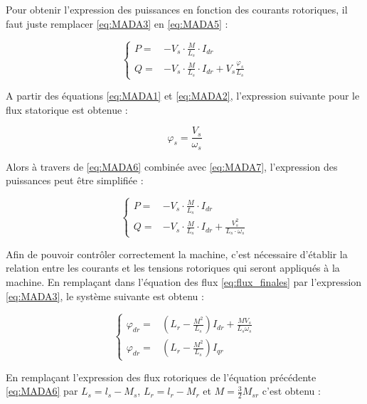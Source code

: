 Pour obtenir l'expression des puissances en fonction des courants rotoriques, il faut juste remplacer \ref{eq:MADA3} en \ref{eq:MADA5} :


\begin{equation}
    \left\{
    \begin{aligned}
        P =& - V_{s} \cdot \frac{M}{L_s} \cdot I_{dr} \\
        Q =& - V_{s} \cdot \frac{M}{L_s} \cdot I_{dr} + V_s \frac{\varphi_s}{L_s} 
    \end{aligned}
    \right.
    \label{eq:MADA6}
\end{equation}

A partir des équations \ref{eq:MADA1} et \ref{eq:MADA2}, l'expression suivante pour le flux statorique est obtenue :

\begin{equation}
    \varphi_s = \frac{V_s}{\omega_s}
    \label{eq:MADA7}
 \end{equation}

 Alors à travers de \ref{eq:MADA6} combinée avec \ref{eq:MADA7}, l'expression des puissances peut être simplifiée :

 \begin{equation}
    \left\{
    \begin{aligned}
        P =& - V_{s} \cdot \frac{M}{L_s} \cdot I_{dr}  \\
        Q =& - V_{s} \cdot \frac{M}{L_s} \cdot I_{dr} +  \frac{V_s^2}{L_s \cdot \omega_s} 
    \end{aligned}
    \right.
    \label{eq:MADA8}
\end{equation}

Afin de pouvoir contrôler correctement la machine, c'est nécessaire d'établir la relation entre les courants et les tensions rotoriques qui seront appliqués à la machine. En remplaçant dans l'équation des flux \ref{eq:flux_finales} par l'expression \ref{eq:MADA3}, le système suivante est obtenu :


\begin{equation}
    \left\{
    \begin{aligned}
        \varphi_{dr} =& \left( L_r - \frac{M^2}{L_s} \right) I_{dr} + \frac{M V_s}{L_s \omega_s} \\
        \varphi_{dr} =& \left( L_r - \frac{M^2}{L_s} \right) I_{qr}
    \end{aligned}
    \right.
    \label{eq:MADA9}
\end{equation}

En remplaçant l'expression des flux rotoriques de l'équation précédente \ref{eq:MADA6} par $L_s = l_s - M_s$, $L_r = l_r - M_r$ et $M = \frac{3}{2}M_{sr}$ c'est obtenu :

